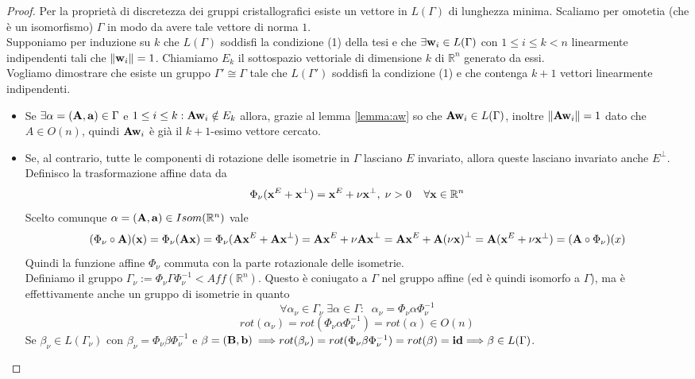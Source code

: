 \documentclass[a4paper,11pt,openright,twoside	]{book}
\begin{document}
\begin{proof}
Per la proprietà di discretezza dei gruppi cristallografici esiste un vettore in $L(\Gamma)$ di lunghezza minima. Scaliamo per omotetia (che è un isomorfismo) $\Gamma$ in modo da avere tale vettore di norma $1$. \\ 
Supponiamo per induzione su $k$ che $L(\Gamma)$ soddisfi la condizione (1) della tesi e che $\exists \vb{w}_i \in L(\Gamma)$ con $1 \leq i \leq k < n $ linearmente indipendenti tali che $\norm{\vb{w}_i} = 1 $.  
Chiamiamo $E_k$ il sottospazio vettoriale di dimensione $k$ di $\mathbb{R}^n$ generato da essi.\\
Vogliamo dimostrare che esiste un gruppo $\Gamma ' \cong \Gamma$ tale che $L(\Gamma')$ soddisfi la condizione (1) e che contenga $k+1$ vettori linearmente indipendenti. 
\begin{itemize}
\item Se $\exists \alpha = (\vb{A, a}) \in \Gamma $ e $1 \leq i \leq k: \vb{Aw}_i \notin E_k$ allora, grazie al lemma \ref{lemma:aw} so che $\vb{Aw}_i \in L(\Gamma)$, inoltre $\norm{\vb{Aw}_i} = 1$ dato che $A \in O(n)$, quindi $\vb{Aw}_i$ è già il $k+1$-esimo vettore cercato.
\item Se, al contrario, tutte le componenti di rotazione delle isometrie in $\Gamma$ lasciano $E$ invariato, allora queste lasciano invariato anche $E^{\perp}$. \\
Definisco la trasformazione affine data da
\[ \Phi_{\nu} (\vb{x}^E + \vb{x}^{\perp} )=  \vb{x}^E + \nu \vb{x}^{\perp} , \; \nu > 0  \; \; \; \; \forall \vb{x} \in \mathbb{R}^n\]
Scelto comunque $\alpha = (\vb{A,a}) \in Isom(\mathbb{R}^n)$ vale
\[ ( \Phi_{\nu}  \circ \vb{A})(\vb{x}) = \Phi_{\nu} (\vb{Ax})  = \Phi_{\nu} (\vb{Ax}^E +\vb{Ax }^{\perp})  = \vb{Ax}^E +\nu \vb{Ax }^{\perp} = \vb{Ax}^E +\vb{A(\nu x) }^{\perp} = \vb{A} ( \vb{x}^E +\nu \vb{x }^{\perp})  = ( \vb{A} \circ \Phi_{\nu} ) (x)\]
Quindi la funzione affine $\Phi_{\nu}$ commuta con la parte rotazionale delle isometrie. \\
Definiamo il gruppo $\Gamma_{\nu} := \Phi_{\nu} \Gamma \Phi_{\nu}^{-1} < Aff(\mathbb{R}^n)$. Questo è coniugato a $\Gamma$ nel gruppo affine (ed è quindi isomorfo a $\Gamma$), ma è effettivamente anche un gruppo di isometrie in quanto 
\[ \forall \alpha_{\nu} \in \Gamma_{\nu} \; \exists \alpha \in \Gamma : \; \; \alpha_{\nu} =  \Phi_{\nu} \alpha \Phi_{\nu}^{-1}  \]
\[ rot( \alpha_{\nu}) = rot(\Phi_{\nu} \alpha \Phi_{\nu}^{-1}) = rot(\alpha) \in O(n)\]
Se $\beta_{\nu} \in L(\Gamma_{\nu}) $ con  $ \beta_{\nu} = \Phi_{\nu} \beta \Phi_{\nu}^{-1}  $ e $\beta = (\vb{B, b}) $ $ \Longrightarrow rot(\beta_{\nu}) = rot(\Phi_{\nu} \beta \Phi_{\nu}^{-1}) = rot(\beta) = \vb{id}  \Longrightarrow \beta \in L(\Gamma)$. \\

\end{itemize}
\end{proof}
\end{document}
